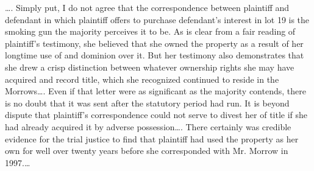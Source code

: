 \ldots. Simply put, I do not agree that the correspondence between plaintiff
and defendant in which plaintiff offers to purchase defendant's interest in lot
19 is the smoking gun the majority perceives it to be. As is clear from a fair
reading of plaintiff's testimony, she believed that she owned the property as a
result of her longtime use of and dominion over it. But her testimony also
demonstrates that she drew a crisp distinction between whatever ownership
rights she may have acquired and record title, which she recognized continued
to reside in the Morrows\ldots. Even if that letter were as significant as the
majority contends, there is no doubt that it was sent after the statutory
period had run. It is beyond dispute that plaintiff's correspondence could not
serve to divest her of title if she had already acquired it by adverse
possession\ldots. There certainly was credible evidence for the trial justice
to find that plaintiff had used the property as her own for well over twenty
years before she corresponded with Mr. Morrow in 1997.\ldots

